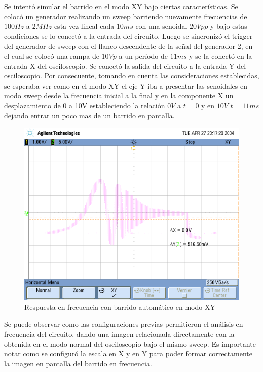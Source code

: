 Se intentó simular el barrido en el modo XY bajo ciertas características.
Se colocó un generador realizando un sweep barriendo nuevamente frecuencias de $100Hz$ a $2MHz$ esta vez lineal cada $10ms$ con una senoidal
$20Vpp$ y bajo estas condiciones se lo conectó a la entrada del circuito.
Luego se sincronizó el trigger del generador de sweep con el flanco
descendente de la señal del generador 2, en el cual se colocó una
rampa de $10Vp$ a un período de $11ms$ y se la conectó en la entrada
X del osciloscopio. Se conectó la salida del circuito a la entrada
Y del osciloscopio. Por consecuente, tomando en cuenta las consideraciones
establecidas, se esperaba ver como en el modo XY el eje Y iba a presentar
las senoidales en modo sweep desde la frecuencia inicial a la final
y en la componente X un desplazamiento de 0 a 10V estableciendo la
relación $0V$ a $t=\text{0}$ y en $10V$ $t=11ms$ dejando entrar
un poco mas de un barrido en pantalla.
\begin{figure}[H]
\centering{}\includegraphics{./scope_24.png}\caption{Respuesta en frecuencia con barrido automático en modo XY}
\end{figure}

Se puede observar como las configuraciones previas permitieron el
análisis en frecuencia del circuito, dando una imagen relacionada
directamente con la obtenida en el modo normal del osciloscopio bajo
el mismo sweep. Es importante notar como se configuró la escala en
X y en Y para poder formar correctamente la imagen en pantalla del
barrido en frecuencia.

